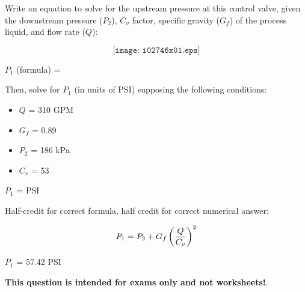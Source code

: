 

Write an equation to solve for the upstream pressure at this control valve, given the downstream pressure ($P_2$), $C_v$ factor, specific gravity ($G_f$) of the process liquid, and flow rate ($Q$):

$$\texttt{[image: i02746x01.eps]}$$

\vskip 10pt

$P_1$ (formula) = 

\vskip 20pt

Then, solve for $P_1$ (in units of PSI) supposing the following conditions:

\begin{itemize}
\item{} $Q$ = 310 GPM
\item{} $G_f$ = 0.89
\item{} $P_2$ = 186 kPa
\item{} $C_v$ = 53
\end{itemize}

\vskip 10pt

\noindent
$P_1$ = \underbar{\hskip 50pt} PSI







Half-credit for correct formula, half credit for correct numerical answer:

\vskip 10pt

$$P_1 = P_2 + G_f \left( {Q \over C_v} \right)^2$$

\vskip 10pt

\noindent
$P_1$ = 57.42 PSI







{\bf This question is intended for exams only and not worksheets!}.



